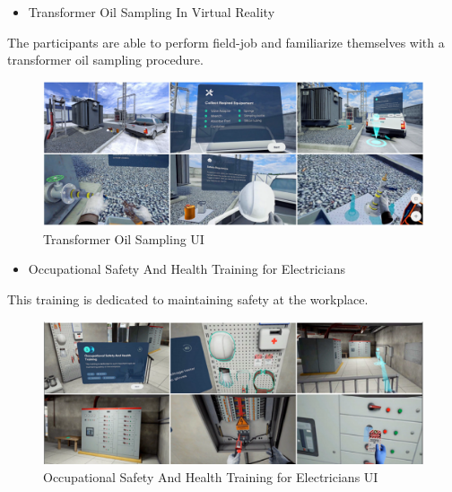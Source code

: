 \documentclass[]{report}
\begin{document}
\begin{itemize}
	\item Transformer Oil Sampling In Virtual Reality
\end{itemize}
The participants are able to perform field-job and familiarize themselves
with a transformer oil sampling procedure.
\begin{figure}[H]
	\includegraphics[scale=0.5]{ESTPEVR.png}
	\caption{Transformer Oil Sampling UI}
\end{figure}
\begin{itemize}
	\item Occupational Safety And Health Training for Electricians
\end{itemize}
This training is dedicated to maintaining safety at the workplace.
\begin{figure}[h]
	\begin{center} \includegraphics[scale=0.6]{ESTPEVR1.png}
	\caption{Occupational Safety And Health Training for Electricians UI}
	\end{center}
\end{figure}
\\\\\\\\\\\\
\par
\end{document}
